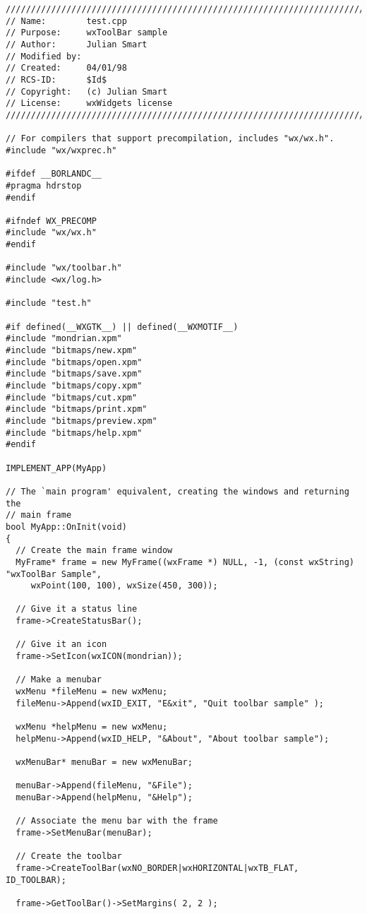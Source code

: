 {\small
\begin{verbatim}
/////////////////////////////////////////////////////////////////////////////
// Name:        test.cpp
// Purpose:     wxToolBar sample
// Author:      Julian Smart
// Modified by:
// Created:     04/01/98
// RCS-ID:      $Id$
// Copyright:   (c) Julian Smart
// License:   	wxWidgets license
/////////////////////////////////////////////////////////////////////////////

// For compilers that support precompilation, includes "wx/wx.h".
#include "wx/wxprec.h"

#ifdef __BORLANDC__
#pragma hdrstop
#endif

#ifndef WX_PRECOMP
#include "wx/wx.h"
#endif

#include "wx/toolbar.h"
#include <wx/log.h>

#include "test.h"

#if defined(__WXGTK__) || defined(__WXMOTIF__)
#include "mondrian.xpm"
#include "bitmaps/new.xpm"
#include "bitmaps/open.xpm"
#include "bitmaps/save.xpm"
#include "bitmaps/copy.xpm"
#include "bitmaps/cut.xpm"
#include "bitmaps/print.xpm"
#include "bitmaps/preview.xpm"
#include "bitmaps/help.xpm"
#endif

IMPLEMENT_APP(MyApp)

// The `main program' equivalent, creating the windows and returning the
// main frame
bool MyApp::OnInit(void)
{
  // Create the main frame window
  MyFrame* frame = new MyFrame((wxFrame *) NULL, -1, (const wxString) "wxToolBar Sample",
     wxPoint(100, 100), wxSize(450, 300));

  // Give it a status line
  frame->CreateStatusBar();

  // Give it an icon
  frame->SetIcon(wxICON(mondrian));

  // Make a menubar
  wxMenu *fileMenu = new wxMenu;
  fileMenu->Append(wxID_EXIT, "E&xit", "Quit toolbar sample" );

  wxMenu *helpMenu = new wxMenu;
  helpMenu->Append(wxID_HELP, "&About", "About toolbar sample");

  wxMenuBar* menuBar = new wxMenuBar;

  menuBar->Append(fileMenu, "&File");
  menuBar->Append(helpMenu, "&Help");

  // Associate the menu bar with the frame
  frame->SetMenuBar(menuBar);

  // Create the toolbar
  frame->CreateToolBar(wxNO_BORDER|wxHORIZONTAL|wxTB_FLAT, ID_TOOLBAR);
  
  frame->GetToolBar()->SetMargins( 2, 2 );


\end{verbatim}}
